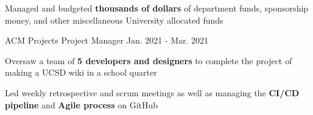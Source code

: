 \begin{cventries}
{\begin{cvitems}
  \item Managed and budgeted \textbf{thousands of dollars} of department funds, sponsorship money, and other miscellaneous University allocated funds
\end{cvitems}
}
{ACM Projects Project Manager}
{Jan. 2021 - Mar. 2021}
{
\begin{cvitems}
  \item Oversaw a team of \textbf{5 developers and designers} to complete the project of making a UCSD wiki in a school quarter
  \item Led weekly retrospective and scrum meetings as well as managing the \textbf{CI/CD pipeline} and \textbf{Agile process} on GitHub
\end{cvitems}
}
\end{cventries}
	